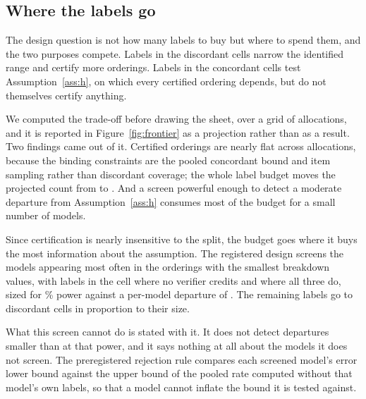 \subsection{Where the labels go}

The design question is not how many labels to buy but where to spend them, and the two
purposes compete. Labels in the discordant cells narrow the identified range and certify more
orderings. Labels in the concordant cells test Assumption~\ref{ass:h}, on which every
certified ordering depends, but do not themselves certify anything.

We computed the trade-off before drawing the sheet, over a grid of allocations, and it is
reported in Figure~\ref{fig:frontier} as a projection rather than as a result. Two findings
came out of it. Certified orderings are nearly flat across allocations, because the binding
constraints are the pooled concordant bound and item sampling rather than discordant coverage;
the whole \AuditBudget{} label budget moves the projected count from \CertPrereg{} to
\ProjectedCertPrereg{}. And a screen powerful enough to detect a moderate departure from
Assumption~\ref{ass:h} consumes most of the budget for a small number of models.

Since certification is nearly insensitive to the split, the budget goes where it buys the most
information about the assumption. The registered design screens the \ScreenedModels{} models
appearing most often in the orderings with the smallest breakdown values, with
\ScreenNRejectAll{} labels in the cell where no verifier credits and \ScreenNAgreeAll{} where
all three do, sized for \ScreenPowerPct\% power against a per-model departure of \ScreenRho{}. The
remaining \LabelsCertification{} labels go to discordant cells in proportion to their size.

What this screen cannot do is stated with it. It does not detect departures smaller than
\ScreenRho{} at that power, and it says nothing at all about the models it does not screen.
The preregistered rejection rule compares each screened model's error lower bound against the
upper bound of the pooled rate computed without that model's own labels, so that a model
cannot inflate the bound it is tested against.
